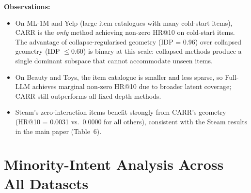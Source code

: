 \documentclass[letterpaper,10pt]{article}
\begin{document}
\noindent\textbf{Observations:}
\begin{itemize}
  \item On ML-1M and Yelp (large item catalogues with many cold-start items), CARR is the \emph{only} method achieving non-zero HR@10 on cold-start items. The advantage of collapse-regularised geometry (IDP = 0.96) over collapsed geometry (IDP $\leq 0.60$) is binary at this scale: collapsed methods produce a single dominant subspace that cannot accommodate unseen items.
  \item On Beauty and Toys, the item catalogue is smaller and less sparse, so Full-LLM achieves marginal non-zero HR@10 due to broader latent coverage; CARR still outperforms all fixed-depth methods.
  \item Steam's zero-interaction items benefit strongly from CARR's geometry (HR@10 = 0.0031 vs.\ 0.0000 for all others), consistent with the Steam results in the main paper (Table~6).
\end{itemize}

\section{Minority-Intent Analysis Across All Datasets}
\label{sec:supp-minority}
\end{document}
